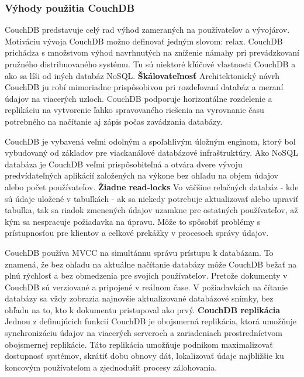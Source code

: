 \subsubsection{Výhody použitia CouchDB}
\indent CouchDB predstavuje celý rad výhod zameraných na používateľov a vývojárov. Motiváciu vývoja CouchDB možno definovať jedným slovom: relax. CouchDB prichádza s množstvom výhod navrhnutých na zníženie námahy pri prevádzkovaní pružného distribuovaného systému. Tu sú niektoré kľúčové vlastnosti CouchDB a ako sa líši od iných databáz NoSQL.\newline
\textbf{Škálovateľnosť} \newline
\indent Architektonický návrh CouchDB ju robí mimoriadne prispôsobivou pri rozdeľovaní databáz a meraní údajov na viacerých uzloch. CouchDB podporuje horizontálne rozdelenie a replikáciu na vytvorenie ľahko spravovaného riešenia na vyrovnanie času potrebného na načítanie aj zápis počas zavádzania databázy.

\indent CouchDB je vybavená veľmi odolným a spoľahlivým úložným enginom, ktorý bol vybudovaný od základov pre viackanálové databázové infraštruktúry. Ako NoSQL databáza je CouchDB veľmi prispôsobiteľná a otvára dvere vývoju predvídateľných aplikácií založených na výkone bez ohľadu na objem údajov alebo počet používateľov\cite{coucdb}.\newline
\textbf{Žiadne read-locks} \newline
\indent Vo väčšine relačných databáz - kde sú údaje uložené v tabuľkách - ak sa niekedy potrebuje aktualizovať alebo upraviť tabuľka, tak sa riadok zmenených údajov uzamkne pre ostatných používateľov, až kým sa nespracuje požiadavka na úpravu. Môže to spôsobiť problémy s prístupnosťou pre klientov a celkové prekážky v procesoch správy údajov.

\indent CouchDB používa MVCC na simultánnu správu prístupu k databázam. To znamená, že bez ohľadu na aktuálne načítanie databázy môže CouchDB bežať na plnú rýchlosť a bez obmedzenia pre svojich používateľov. Pretože dokumenty v CouchDB sú verziované a pripojené v reálnom čase. V požiadavkách na čítanie databázy sa vždy zobrazia najnovšie aktualizované databázové snímky, bez ohľadu na to, kto k dokumentu pristupoval ako prvý\cite{coucdb}.\newline
\textbf{CouchDB replikácia} \newline
\indent Jednou z definujúcich funkcií CouchDB je obojsmerná replikácia, ktorá umožňuje synchronizáciu údajov na viacerých serveroch a zariadeniach prostredníctvom obojsmernej replikácie. Táto replikácia umožňuje podnikom maximalizovať dostupnosť systémov, skrátiť dobu obnovy dát, lokalizovať údaje najbližšie ku koncovým používateľom a zjednodušiť procesy zálohovania.

